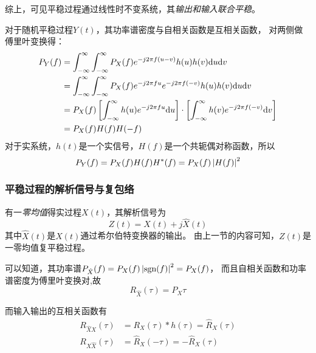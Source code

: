     综上，可见平稳过程通过线性时不变系统，其\emph{输出和输入联合平稳}。

    对于随机平稳过程$Y(t)$，其功率谱密度与自相关函数是互相关函数，
    对两侧做傅里叶变换得：
    \begin{equation}
        \begin{split}
            P_Y(f)  &=\int_{-\infty}^{\infty}\int_{-\infty}^{\infty}P_X(f)e^{-j2\pi f(u-v)}h(u)h(v)\text{\upshape d} u\text{\upshape d} v\\
                    &=\int_{-\infty}^{\infty}\int_{-\infty}^{\infty}P_X(f)e^{-j2\pi f u}e^{-j2\pi f(-v)}h(u)h(v)\text{\upshape d} u\text{\upshape d} v\\
                    &=P_X(f)\left[\int_{-\infty}^{\infty}h(u)e^{-j2\pi f u}\text{\upshape d} u\right]\cdot\left[\int_{-\infty}^{\infty}h(v)e^{-j2\pi f (-v)}\text{\upshape d} v\right]\\
                    &=P_X(f)H(f)H(-f)
        \end{split}
    \end{equation}
    对于实系统，$h(t)$是一个实信号，$H(f)$是一个共轭偶对称函数，所以
    \begin{equation}
        P_Y(f)=P_X(f)H(f)H^*(f)=P_X(f)\left\vert H(f) \right\vert^2
    \end{equation}
    
    \subsubsection{平稳过程的解析信号与复包络}
    有一\emph{零均值}得实过程$X(t)$，其解析信号为
    \begin{equation}
        Z(t)=X(t)+j\hat{X}(t)
    \end{equation}
    其中$\hat{X}(t)$是$X(t)$通过希尔伯特变换器的输出。
    由上一节的内容可知，$Z(t)$是一零均值复平稳过程。

    可以知道，其功率谱$P_{\hat{X}}(f)=P_X(f)\left\vert \text{sgn}(f) \right\vert^2=P_X(f)$，
    而且自相关函数和功率谱密度为傅里叶变换对,故
    \begin{equation}
        R_{\hat{X}}(\tau)=P_X{\tau}
    \end{equation}
    
    而输入输出的互相关函数有
    \begin{align}
        R_{\hat{X}X}(\tau)&=R_X(\tau)*h(\tau)=\hat{R}_X(\tau)\\
        R_{X\hat{X}}(\tau)&=\hat{R}_X(-\tau)=-\hat{R}_X(\tau)
    \end{align}

